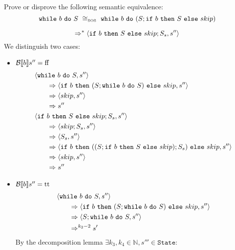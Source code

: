 \begin{exercise}{
    Prove or disprove the following semantic equivalence:
    \[ \wwhile{b}{S}\ \cong_{\text{\tiny SOS}}\ \wwhile{b}{(S;\wif{b}{S}{skip})} \]
}
\begin{itemize}
\begin{itemize}
\begin{itemize}
\[                                \Rightarrow^*
                                \left<\texttt{if}\ b\ \texttt{then}\ S\ \texttt{else}\ skip;S_s, s''\right>
                            \]
                            We distinguish two cases:
                            \begin{itemize}
                                \item $\mathcal{B} \llbracket b \rrbracket s'' = \text{ff}$
                                    \begin{align*}
                                        &\left<\texttt{while}\ b\ \texttt{do}\ S, s''\right>
                                        \\&\qquad\Rightarrow \left<\texttt{if}\ b\ \texttt{then}\ (S; \texttt{while}\ b\ \texttt{do}\ S)\ \texttt{else}\ skip, s''\right>
                                        \\&\qquad\Rightarrow \left<skip, s''\right>
                                        \\&\qquad\Rightarrow s''
                                        \\
                                        &\left<\texttt{if}\ b\ \texttt{then}\ S\ \texttt{else}\ skip;S_s, s''\right>
                                        \\&\qquad\Rightarrow \left<skip;S_s, s''\right>
                                        \\&\qquad\Rightarrow \left<S_s, s''\right>
                                        \\&\qquad\Rightarrow \left<\texttt{if}\ b\ \texttt{then}\ ((S;\texttt{if}\ b\ \texttt{then}\ S\ \texttt{else}\ skip);S_s)\ \texttt{else}\ skip, s''\right>
                                        \\&\qquad\Rightarrow \left<skip, s''\right>
                                        \\&\qquad\Rightarrow s''
                                    \end{align*}
                                \item $\mathcal{B} \llbracket b \rrbracket s'' = \text{tt}$
                                    \begin{align*}
                                        &\left<\texttt{while}\ b\ \texttt{do}\ S, s''\right>
                                        \\&\qquad\Rightarrow \left<\texttt{if}\ b\ \texttt{then}\ (S; \texttt{while}\ b\ \texttt{do}\ S)\ \texttt{else}\ skip, s''\right>
                                        \\&\qquad\Rightarrow \left<S; \texttt{while}\ b\ \texttt{do}\ S, s''\right>
                                        \\&\qquad\Rightarrow^{k_2 - 2} s'
                                    \end{align*}
                                    By the decomposition lemma $\exists k_3, k_4 \in \mathbb{N}, s''' \in \texttt{State} :$

\end{itemize}
\end{itemize}
\end{itemize}
\end{itemize}
\end{exercise}
